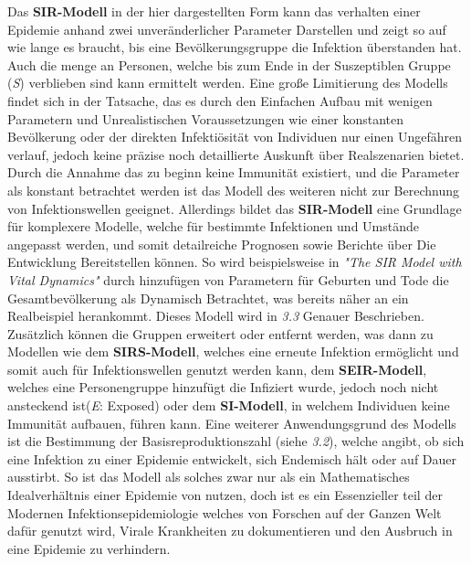\documentclass[12pt]{scrartcl} %
\begin{document}
Das \textbf{SIR-Modell} in der hier dargestellten Form kann das verhalten einer Epidemie anhand zwei unveränderlicher Parameter Darstellen und zeigt so auf wie lange es braucht, bis eine Bevölkerungsgruppe die Infektion überstanden hat. Auch die menge an Personen, welche bis zum Ende in der Suszeptiblen Gruppe (\textit{S}) verblieben sind kann ermittelt werden. 
Eine große Limitierung des Modells findet sich in der Tatsache, das es durch den Einfachen Aufbau mit wenigen Parametern und Unrealistischen Voraussetzungen wie einer konstanten Bevölkerung oder der direkten Infektiösität von Individuen nur einen Ungefähren verlauf, jedoch keine präzise noch detaillierte Auskunft über Realszenarien bietet.
Durch die Annahme das zu beginn keine Immunität existiert, und die Parameter als konstant betrachtet werden ist das Modell des weiteren nicht zur Berechnung von Infektionswellen geeignet.
Allerdings bildet das \textbf{SIR-Modell} eine Grundlage für komplexere Modelle, welche für bestimmte Infektionen und Umstände angepasst werden, und somit detailreiche Prognosen sowie Berichte über Die Entwicklung Bereitstellen können.
So wird beispielsweise in \textsl{"The SIR Model with Vital Dynamics"} \cite[s.132]{5} durch hinzufügen von Parametern für Geburten und Tode die Gesamtbevölkerung als Dynamisch Betrachtet, was bereits näher an ein Realbeispiel herankommt.
Dieses Modell wird in \textsl{3.3} Genauer Beschrieben.\\
Zusätzlich können die Gruppen erweitert oder entfernt werden, was dann zu Modellen wie dem 
\textbf{SIRS-Modell}, welches eine erneute Infektion ermöglicht und somit auch für Infektionswellen genutzt werden kann, dem \textbf{SEIR-Modell}, welches eine Personengruppe hinzufügt die Infiziert wurde, jedoch noch nicht ansteckend ist(\textit{E}: Exposed) oder dem \textbf{SI-Modell}, in welchem Individuen keine Immunität aufbauen, führen kann.
Eine weiterer Anwendungsgrund des Modells ist die Bestimmung der Basisreproduktionszahl (siehe \textsl{3.2}), welche angibt, ob sich eine Infektion zu einer Epidemie entwickelt, sich Endemisch hält oder auf Dauer ausstirbt. \cite[vgl.]{2}
So ist das Modell als solches zwar nur als ein Mathematisches Idealverhältnis einer Epidemie von nutzen, doch ist es ein Essenzieller teil der Modernen Infektionsepidemiologie welches von Forschen auf der Ganzen Welt dafür genutzt wird, Virale Krankheiten zu dokumentieren und den Ausbruch in eine Epidemie zu verhindern. \cite[vgl. s.3]{3}
\end{document}
